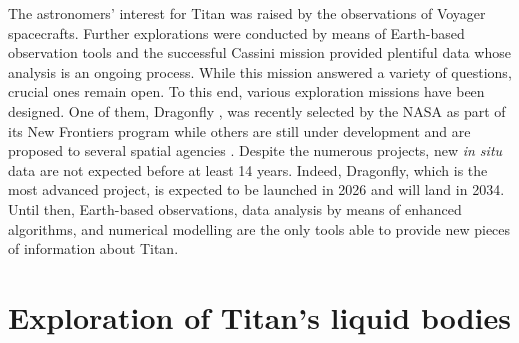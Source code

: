 

The astronomers' interest for Titan was raised by the observations of Voyager spacecrafts. Further explorations were conducted by means of Earth-based observation tools and the successful Cassini mission provided plentiful data whose analysis is an ongoing process. While this mission answered a variety of questions, crucial ones remain open. To this end, various exploration missions have been designed. One of them, Dragonfly \citep{lorenz2018dragonfly}, was recently selected by the NASA as part of its New Frontiers program while others are still under development and are proposed to several spatial agencies \citep{mitri2014exploration,hartwig2016exploring}. Despite the numerous projects, new \textit{in situ} data are not expected before at least 14 years. Indeed, Dragonfly, which is the most advanced project, is expected to be launched in 2026 and will land in 2034. Until then, Earth-based observations, data analysis by means of enhanced algorithms, and numerical modelling are the only tools able to provide new pieces of information about Titan.



\section*{Exploration of Titan's liquid bodies}


